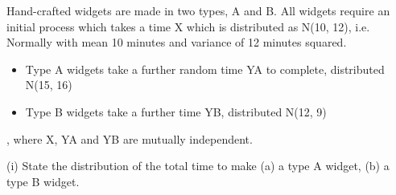 \documentclass[a4paper,12pt]{article}
\begin{document}

Hand-crafted widgets are made in two types, A and B. All widgets require an initial
process which takes a time X which is distributed as N(10, 12), i.e. Normally with
mean 10 minutes and variance of 12 minutes squared. 

\begin{itemize}
    \item Type A widgets take a further random
time YA to complete, distributed N(15, 16)
\item Type B widgets take a further time YB,
distributed N(12, 9)
\end{itemize}
, where X, YA and YB are mutually independent.
\begin{framed}
(i) State the distribution of the total time to make
(a) a type A widget,
(b) a type B widget.
\end{framed}
\end{document}
